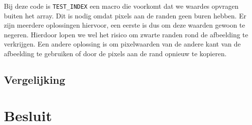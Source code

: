 \documentclass[10pt, twocolumn, a4paper]{article}
\begin{document}
Bij deze code is \texttt{TEST_INDEX} een macro die voorkomt dat we waardes opvragen buiten het array. Dit is nodig omdat pixels aan de randen geen buren hebben. Er zijn meerdere oplossingen hiervoor, een eerste is dus om deze waarden gewoon te negeren. Hierdoor lopen we wel het risico om zwarte randen rond de afbeelding te verkrijgen. Een andere oplossing is om pixelwaarden van de andere kant van de afbeelding te gebruiken of door de pixels aan de rand opnieuw te kopieren. 



\subsection{Vergelijking}
\section{Besluit}

\onecolumn

\appendix
\inputminted[tabsize=4,obeytabs]{c}{labo2.c}
\newpage
\inputminted[tabsize=4,obeytabs]{c}{labo2_gray.c}

\end{document}

